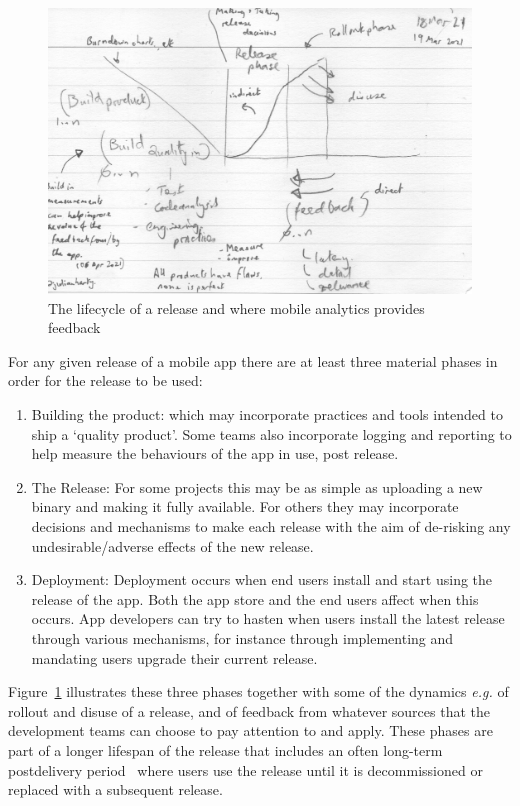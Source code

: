 \begin{figure}
    \centering
    \includegraphics[width=15cm]{images/rough-sketches/Red-Thread-Rough-Sketch.jpeg}
    \caption{The lifecycle of a release and where mobile analytics provides feedback}
    \label{fig:red-thread-for-this-thesis}
\end{figure}

For any given release of a mobile app there are at least three material phases in order for the release to be used:
\begin{enumerate}
    \item Building the product: which may incorporate practices and tools intended to ship a `quality product'. Some teams also incorporate logging and reporting to help measure the behaviours of the app in use, post release.
    \item The Release: For some projects this may be as simple as uploading a new binary and making it fully available. For others they may incorporate decisions and mechanisms to make each release with the aim of de-risking any undesirable/adverse effects of the new release.
    \item Deployment: Deployment occurs when end users install and start using the release of the app. Both the app store and the end users affect when this occurs. App developers can try to hasten when users install the latest release through various mechanisms, for instance through implementing and mandating users upgrade their current release.
\end{enumerate}

Figure~\ref{fig:red-thread-for-this-thesis} illustrates these three phases together with some of the dynamics \emph{e.g.} of rollout and disuse of a release, and of feedback from whatever sources that the development teams can choose to pay attention to and apply. These phases are part of a longer lifespan of the release that includes an often long-term postdelivery period~\citep[pp 156-157]{evans2004_achieving_software_quality_through_teamwork} where users use the release until it is decommissioned or replaced with a subsequent release.


